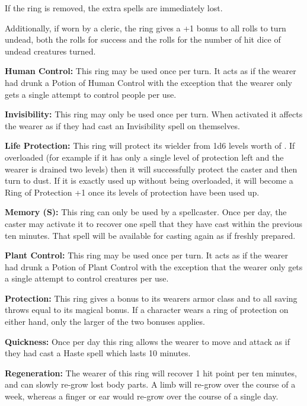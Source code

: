 \begin{multicols*}{2}
If the ring is removed, the extra spells are immediately lost.

Additionally, if worn by a cleric, the ring gives a +1 bonus to all rolls to turn undead, both the rolls for success and the rolls for the number of hit dice of undead creatures turned.

\textbf{Human Control:} This ring may be used once per turn. It acts as if the wearer had drunk a Potion of Human Control with the exception that the wearer only gets a single attempt to control people per use.

\textbf{Invisibility:} This ring may only be used once per turn. When activated it affects the wearer as if they had cast an Invisibility spell on themselves.

\textbf{Life Protection:} This ring will protect its wielder from 1d6 levels worth of . If overloaded (for example if it has only a single level of protection left and the wearer is drained two levels) then it will successfully protect the caster and then turn to dust. If it is exactly used up without being overloaded, it will become a Ring of Protection +1 once its levels of protection have been used up.

\textbf{Memory (S):} This ring can only be used by a spellcaster. Once per day, the caster may activate it to recover one spell that they have cast within the previous ten minutes. That spell will be available for casting again as if freshly prepared.

\textbf{Plant Control:} This ring may be used once per turn. It acts as if the wearer had drunk a Potion of Plant Control with the exception that the wearer only gets a single attempt to control creatures per use.

\textbf{Protection:} This ring gives a bonus to its wearers armor class and to all saving throws equal to its magical bonus. If a character wears a ring of protection on either hand, only the larger of the two bonuses applies.

\textbf{Quickness:} Once per day this ring allows the wearer to move and attack as if they had cast a Haste spell which lasts 10 minutes.

\textbf{Regeneration:} The wearer of this ring will recover 1 hit point per ten minutes, and can slowly re-grow lost body parts. A limb will re-grow over the course of a week, whereas a finger or ear would re-grow over the course of a single day.


\end{multicols*}
